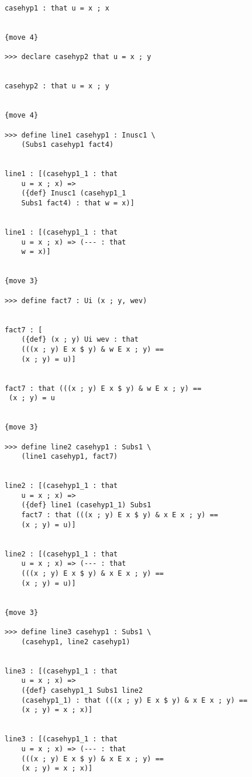 \documentclass[12pt]{article}
\begin{document}
\begin{verbatim}
            casehyp1 : that u = x ; x


            {move 4}

            >>> declare casehyp2 that u = x ; y


            casehyp2 : that u = x ; y


            {move 4}

            >>> define line1 casehyp1 : Inusc1 \
                (Subs1 casehyp1 fact4)


            line1 : [(casehyp1_1 : that 
                u = x ; x) => 
                ({def} Inusc1 (casehyp1_1 
                Subs1 fact4) : that w = x)]


            line1 : [(casehyp1_1 : that 
                u = x ; x) => (--- : that 
                w = x)]


            {move 3}

            >>> define fact7 : Ui (x ; y, wev)


            fact7 : [
                ({def} (x ; y) Ui wev : that 
                (((x ; y) E x $ y) & w E x ; y) == 
                (x ; y) = u)]


            fact7 : that (((x ; y) E x $ y) & w E x ; y) == 
             (x ; y) = u


            {move 3}

            >>> define line2 casehyp1 : Subs1 \
                (line1 casehyp1, fact7)


            line2 : [(casehyp1_1 : that 
                u = x ; x) => 
                ({def} line1 (casehyp1_1) Subs1 
                fact7 : that (((x ; y) E x $ y) & x E x ; y) == 
                (x ; y) = u)]


            line2 : [(casehyp1_1 : that 
                u = x ; x) => (--- : that 
                (((x ; y) E x $ y) & x E x ; y) == 
                (x ; y) = u)]


            {move 3}

            >>> define line3 casehyp1 : Subs1 \
                (casehyp1, line2 casehyp1)


            line3 : [(casehyp1_1 : that 
                u = x ; x) => 
                ({def} casehyp1_1 Subs1 line2 
                (casehyp1_1) : that (((x ; y) E x $ y) & x E x ; y) == 
                (x ; y) = x ; x)]


            line3 : [(casehyp1_1 : that 
                u = x ; x) => (--- : that 
                (((x ; y) E x $ y) & x E x ; y) == 
                (x ; y) = x ; x)]



\end{verbatim}
\end{document}
